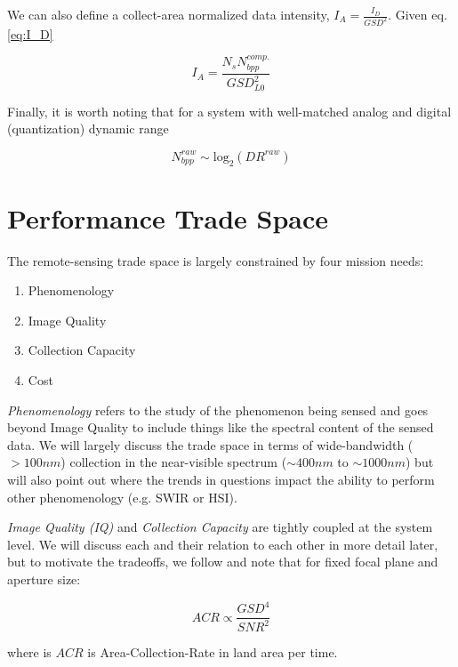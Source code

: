 \documentclass[10pt,journal]{IEEEtran}  %
\begin{document}
We can also define a collect-area normalized data intensity, $I_A = \frac{I_{D}}{GSD^2}$.  Given eq. \ref{eq:I_D}

\begin{equation}
    I_A = \frac{N_s N_{bpp}^{comp.}}{GSD_{L0}^2}
\end{equation}

Finally, it is worth noting that for a system with well-matched analog and digital (quantization) dynamic range

\begin{equation}
    N_{bpp}^{raw} \sim \textrm{log}_2(DR^{raw})
\end{equation}

\section{Performance Trade Space}
\label{sec:trade_space}

The remote-sensing trade space is largely constrained by four mission needs:

\begin{enumerate}
\item Phenomenology
\item Image Quality
\item Collection Capacity
\item Cost
\end{enumerate}

\emph{Phenomenology} refers to the study of the phenomenon being sensed and goes beyond Image Quality to include things like the spectral content of the sensed data.  We will largely discuss the trade space in terms of wide-bandwidth ($>100nm$) collection in the near-visible spectrum ($\sim 400nm$ to $\sim 1000nm$) but will also point out where the trends in questions impact the ability to perform other phenomenology (e.g. SWIR or HSI).

\emph{Image Quality (IQ)} and \emph{Collection Capacity} are tightly coupled at the system level.  We will discuss each and their relation to each other in more detail later, but to motivate the tradeoffs, we follow \cite{shaw} and note that for fixed focal plane and aperture size:

\begin{equation}
    \label{eq:acr_scaling}
    ACR \propto \frac{GSD^4}{SNR^2}
\end{equation}

where is $ACR$ is Area-Collection-Rate in land area per time.
\end{document}
